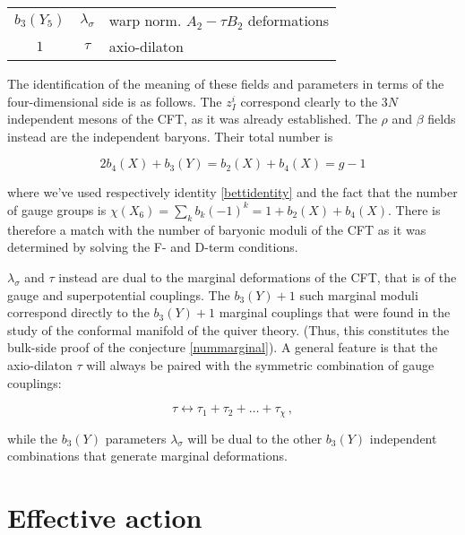 \begin{center}
\begin{tabular}{|c | c | l |}
	\hline
	$b_3(Y_5)$ 	& $\lambda_\sigma$	& warp norm. $A_2 - \tau B_2$ deformations\\
	$1$		& $\tau$		& axio-dilaton\\
	\hline
\end{tabular}
\end{center}

The identification of the meaning of these fields and parameters in terms of the four-dimensional side is as follows. The $z_I^i$ correspond clearly to the $3N$ independent mesons of the CFT, as it was already established. The $\rho$ and $\beta$ fields instead are the independent baryons. Their total number is

\begin{equation}
	2 b_4(X) + b_3(Y) = b_2(X) + b_4(X) = g - 1
	\label{}
\end{equation}

where we've used respectively identity \eqref{bettidentity} and the fact that the number of gauge groups is $\chi(X_6) = \sum_k b_k (-1)^k = 1 + b_2(X) + b_4(X) $. There is therefore a match with the number of baryonic moduli of the CFT as it was determined by solving the F- and D-term conditions.

$\lambda_\sigma$ and $\tau$ instead are dual to the marginal deformations of the CFT, that is of the gauge and superpotential couplings. The $b_3(Y) + 1$ such marginal moduli correspond directly to the $b_3(Y) + 1$ marginal couplings that were found in the study of the conformal manifold of the quiver theory. (Thus, this constitutes the bulk-side proof of the conjecture \eqref{nummarginal}). A general feature is that the axio-dilaton $\tau$ will always be paired with the symmetric combination of gauge couplings:

\begin{equation}
	\tau \leftrightarrow \tau_1 + \tau_2 + \ldots + \tau_\chi\,,
	\label{}
\end{equation}

while the $b_3(Y)$ parameters $\lambda_\sigma$ will be dual to the other $b_3(Y)$ independent combinations that generate marginal deformations.

\section{Effective action}\label{sec:heftlagrangian}

